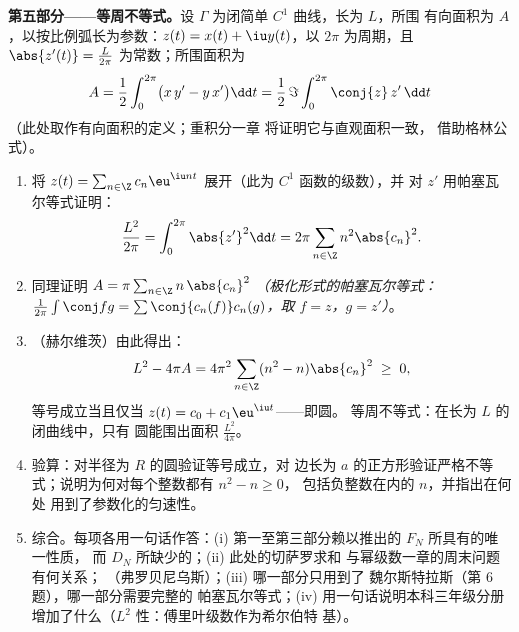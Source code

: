 \begin{problem}
\medskip
\noindent\textbf{第五部分——等周不等式。}设
$\Gamma$ 为闭简单 $C^1$ 曲线，长为 $L$，所围
有向面积为 $A$，以按比例弧长为参数：$z(t) =
x(t) + \iu y(t)$，以 $2\pi$ 为周期，且 $\abs{z'(t)} =
\frac{L}{2\pi}$ 为常数；所围面积为
\[
A = \frac12\int_0^{2\pi}\bigl(x\,y' - y\,x'\bigr)\dd t
= \frac{1}{2}\,\Im\int_0^{2\pi}\conj{z}\,z'\,\dd t
\]
（此处取作有向面积的定义；重积分一章
将证明它与直观面积一致，
借助格林公式）。
\begin{enumerate}[resume]
  \item 将 $z(t) = \sum_{n\in\Z}c_n\eu^{\iu nt}$ 展开（此为
        $C^1$ 函数的级数），并
        对 $z'$ 用帕塞瓦尔等式证明：
        \[
        \frac{L^2}{2\pi} = \int_0^{2\pi}\abs{z'}^2\dd t
        = 2\pi\sum_{n\in\Z}n^2\abs{c_n}^2 .
        \]
  \item 同理证明 $A = \pi\sum_{n\in\Z}
        n\,\abs{c_n}^2$ \emph{（极化形式的帕塞瓦尔等式：
        $\frac{1}{2\pi}\int\conj f g = \sum
        \conj{c_n(f)}c_n(g)$，取 $f = z$，$g = z'$）}。
  \item （赫尔维茨）由此得出：
        \[
        L^2 - 4\pi A = 4\pi^2\sum_{n\in\Z}
        (n^2 - n)\abs{c_n}^2 \;\geq\; 0 ,
        \]
        等号成立当且仅当 $z(t) = c_0 +
        c_1\eu^{\iu t}$——即圆。
        等周不等式：在长为 $L$ 的闭曲线中，只有
        圆能围出面积 $\frac{L^2}{4\pi}$。
  \item 验算：对半径为
        $R$ 的圆验证等号成立，对
        边长为 $a$ 的正方形验证严格不等式；说明为何对每个整数都有 $n^2 - n \geq 0$，
        包括负整数在内的 $n$，并指出在何处
        用到了参数化的匀速性。
  \item 综合。每项各用一句话作答：(i) 第一至第三部分赖以推出的
        $F_N$ 所具有的唯一性质，
        而 $D_N$ 所缺少的；(ii) 此处的切萨罗求和
        与幂级数一章的周末问题有何关系；
        （弗罗贝尼乌斯）；(iii) 哪一部分只用到了
        魏尔斯特拉斯（第 6 题），哪一部分需要完整的
        帕塞瓦尔等式；(iv) 用一句话说明本科三年级分册
        增加了什么（$L^2$ 性：傅里叶级数作为希尔伯特
        基）。
\end{enumerate}
\end{problem}
